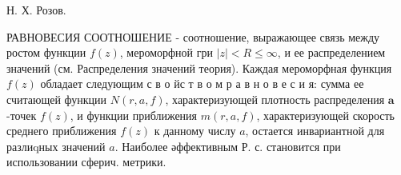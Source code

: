 \documentclass[10pt]{article}
\begin{document}
Н. Х. Розов.



РАВНОВЕСИЯ СООТНОШЕНИЕ - соотношение, выражающее связь между ростом функции $f(z)$, мероморфной гри $|z|<R \leqslant \infty$, и ее распределением значений (см. Распределения значений теория). Каждая мероморфная функция $f(z)$ обладает следующим с в о йс т в о м р а в н о в е с и я: сумма ее считающей функции $N(r, a, f)$, характеризующей плотность распределения $\boldsymbol{a}$-точек $f(z)$, и функции приближения $m(r, a, f)$, характеризующей скорость среднего приближения $f(z)$ к данному числу $a$, остается инвариантной для разлиqных значений $a$. Наиболее әффективным Р. с. становится при использовании сферич. метрики.
\end{document}
